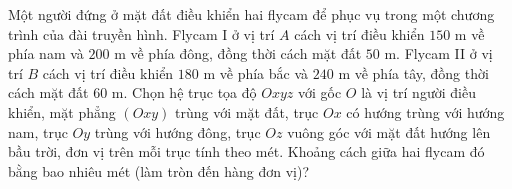 \begin{ex}%
        Một người đứng ở mặt đất điều khiển hai flycam để phục vụ trong một chương trình của đài truyền hình. Flycam I ở vị trí $A$ cách vị trí điều khiển $150$ m về phía nam và $200$ m về phía đông, đồng thời cách mặt đất $50$ m. Flycam II ở vị trí $B$ cách vị trí điều khiển $180$ m về phía bắc và $240$ m về phía tây, đồng thời cách mặt đất $60$ m. Chọn hệ trục tọa độ $Oxyz$ với gốc $O$ là vị trí người điều khiển, mặt phẳng $(Oxy)$ trùng với mặt đất, trục $Ox$ có hướng trùng với hướng nam, trục $Oy$ trùng với hướng đông, trục $Oz$ vuông góc với mặt đất hướng lên bầu trời, đơn vị trên mỗi trục tính theo mét. Khoảng cách giữa hai flycam đó bằng bao nhiêu mét (làm tròn đến hàng đơn vị)?	
    \end{ex}

